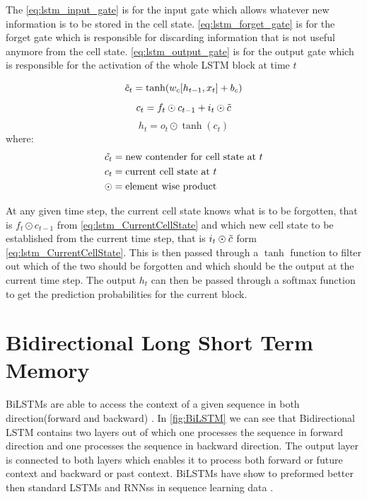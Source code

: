 The \ref{eq:lstm_input_gate} is for the input gate which allows whatever new information is to be stored in the cell state. \ref{eq:lstm_forget_gate} is for the forget gate which is responsible for discarding information that is not useful anymore from the cell state. \ref{eq:lstm_output_gate} is for the output gate which is responsible for the activation of the whole \gls{LSTM} block at time $t$ 


\begin{equation}\label{eq:lstm_newCellState}
    \Tilde{c}_{t} =\tanh(w_{c}[h_{t-1},x_{t}]+b_{c})
\end{equation}
\begin{equation} \label{eq:lstm_CurrentCellState}
    c_{t} = f_{t} \odot c_{t-1} + i_{t} \odot \Tilde{c}
\end{equation}
\begin{equation}\label{eq:lstm_output}
    h_{t} = o_{t} \odot \tanh(c_{t})
\end{equation}
where:
\begin{align*}
      & \Tilde{c_{t}}=\text{new contender for cell state at $t$}\\
      & c_{t}=\text{current cell state at $t$}\\
      & \odot=\text{element wise product}
\end{align*}


At any given time step, the current cell state knows what is to be forgotten, that is $f_{t}\odot c_{t-1}$ from \ref{eq:lstm_CurrentCellState} and which new cell state to be established from the current time step, that is $i_{t}\odot \Tilde{c}$ form \ref{eq:lstm_CurrentCellState}. This is then passed through a $\tanh$ function to filter out which of the two should be forgotten and which should be the output at the current time step. The output $h_{t}$ can then be passed through a softmax function to get the prediction probabilities for the current block.




\section{Bidirectional Long Short Term Memory}
\glspl{BiLSTM} are  able to access the context of a given sequence in both direction(forward and backward) \cite{schuster1997bidirectional}. In \ref{fig:BiLSTM} we can see that Bidirectional LSTM contains two layers out of which one processes the sequence in forward direction and one processes the sequence in backward direction. The output layer is connected to both layers which enables it to process both forward or future context and backward or past context. \glspl{BiLSTM} have show to preformed better then standard \glspl{LSTM} and \glspl{RNN}s in sequence learning data \cite{baldi2000bidirectional} \cite{fukada1999phoneme}.

